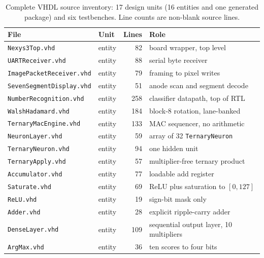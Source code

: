 \documentclass[11pt,a4paper]{article}
\begin{document}
\begin{table}[H]
\centering
\small
\caption{Complete VHDL source inventory: 17 design units (16 entities and one
  generated package) and six testbenches. Line counts are non-blank source
  lines.}
\label{tab:inventory}
\begin{tabular}{@{}l@{\hspace{12pt}}l@{\hspace{8pt}}r@{\hspace{10pt}}l@{}}
\toprule
\textbf{File} & \textbf{Unit} & \textbf{Lines} & \textbf{Role} \\
\midrule
\texttt{Nexys3Top.vhd}          & entity          &  82 & board wrapper, top level \\
\texttt{UARTReceiver.vhd}       & entity          &  88 & serial byte receiver \\
\texttt{ImagePacketReceiver.vhd}& entity          &  79 & framing to pixel writes \\
\texttt{SevenSegmentDisplay.vhd}& entity          &  51 & anode scan and segment decode \\
\texttt{NumberRecognition.vhd}  & entity          & 258 & classifier datapath, top of RTL \\
\texttt{WalshHadamard.vhd}      & entity          & 184 & block-8 rotation, lane-banked \\
\texttt{TernaryMacEngine.vhd}   & entity          & 133 & MAC sequencer, no arithmetic \\
\texttt{NeuronLayer.vhd}        & entity          &  59 & array of 32 \texttt{TernaryNeuron} \\
\texttt{TernaryNeuron.vhd}      & entity          &  94 & one hidden unit \\
\texttt{TernaryApply.vhd}       & entity          &  57 & multiplier-free ternary product \\
\texttt{Accumulator.vhd}        & entity          &  77 & loadable add register \\
\texttt{Saturate.vhd}           & entity          &  69 & ReLU plus saturation to $[0,127]$ \\
\texttt{ReLU.vhd}               & entity          &  19 & sign-bit mask only \\
\texttt{Adder.vhd}              & entity          &  28 & explicit ripple-carry adder \\
\texttt{DenseLayer.vhd}         & entity          & 109 & sequential output layer, 10 multipliers \\
\texttt{ArgMax.vhd}             & entity          &  36 & ten scores to four bits \\

\end{tabular}
\end{table}
\end{document}

